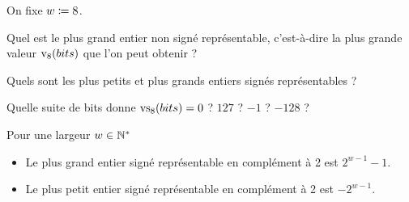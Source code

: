 \documentclass{magnoliaold}
\begin{document}
\begin{exoUnique}
  \exo
  On fixe $w \coloneqq 8$.
  \begin{questions}
    \item Quel est le plus grand entier non signé représentable, c'est-à-dire
          la plus grande valeur ${\rm v}_{8}(bits)$ que l'on peut obtenir ?
    \item Quels sont les plus petits et plus grands entiers signés
          représentables ?
    \item Quelle suite de bits donne ${\rm vs}_{8}(bits) = 0$ ? $127$ ?
          $-1$ ? $-128$ ?
  \end{questions}
\end{exoUnique}

\begin{proposition}
  Pour une largeur $w\in{\mathbb{N}^*}$
  \begin{itemize}
    \item Le plus grand entier signé représentable en complément à 2 est
          $2^{w - 1} - 1$.
    \item Le plus petit entier signé représentable en complément à 2 est
          $-2^{w - 1}$.
  \end{itemize}
\end{proposition}
\end{document}
